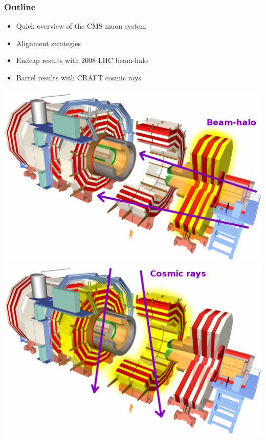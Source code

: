 \documentclass[compress]{beamer}
\begin{document}
\begin{frame}
\frametitle{Outline}
\begin{itemize}\setlength{\itemsep}{0.4 cm}
\item Quick overview of the CMS muon system

\item Alignment strategies

\item Endcap results with 2008 LHC beam-halo

\item Barrel results with CRAFT cosmic rays
\end{itemize}

\vfill
\includegraphics[width=0.47\linewidth]{CMS_exploded_endcap.png} \hfill \includegraphics[width=0.47\linewidth]{CMS_exploded_barrel.png}
\end{frame}
\end{document}
